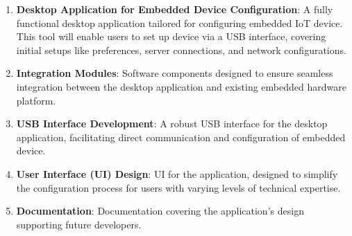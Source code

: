 \documentclass[a4paper, 11pt]{article}
\begin{document}
\begin{enumerate}
  \item \textbf{Desktop Application for Embedded Device Configuration}: A fully functional desktop application tailored for configuring embedded IoT device. This tool will enable users to set up device via a USB interface, covering initial setups like preferences, server connections, and network configurations.
  \item \textbf{Integration Modules}: Software components designed to ensure seamless integration between the desktop application and existing embedded hardware platform.

  \item \textbf{USB Interface Development}: A robust USB interface for the desktop application, facilitating direct communication and configuration of embedded device.
  
  \item \textbf{User Interface (UI) Design}: UI for the application, designed to simplify the configuration process for users with varying levels of technical expertise.
  
  \item \textbf{Documentation}: Documentation covering the application's design supporting future developers.

\end{enumerate}
\pagebreak
\end{document}

